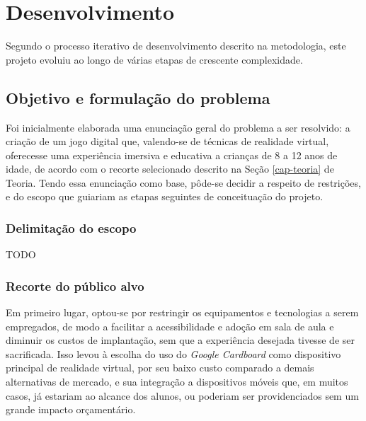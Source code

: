 
\chapter{Desenvolvimento}\label{cap-desenvolvimento}

Segundo o processo iterativo de desenvolvimento descrito na metodologia, este projeto evoluiu ao longo de várias etapas de crescente complexidade.


\section{Objetivo e formulação do problema}\label{sec-objetivos-formulacao-problema}

Foi inicialmente elaborada uma enunciação geral do problema a ser resolvido: a criação de um jogo digital que, valendo-se de técnicas de realidade virtual, oferecesse uma experiência imersiva e educativa a crianças de 8 a 12 anos de idade, de acordo com o recorte selecionado descrito na Seção \ref{cap-teoria} de Teoria. Tendo essa enunciação como base, pôde-se decidir a respeito de restrições, e do escopo que guiariam as etapas seguintes de conceituação do projeto.

\subsection{Delimitação do escopo}\label{subsec-delimitacao-escopo}
TODO

\subsection{Recorte do público alvo}\label{subsec-recorte-publico-alvo}

Em primeiro lugar, optou-se por restringir os equipamentos e tecnologias a serem empregados, de modo a facilitar a acessibilidade e adoção em sala de aula e diminuir os custos de implantação, sem que a experiência desejada tivesse de ser sacrificada. Isso levou à escolha do uso do \textit{Google Cardboard} como dispositivo principal de realidade virtual, por seu baixo custo comparado a demais alternativas de mercado, e sua integração a dispositivos móveis que, em muitos casos, já estariam ao alcance dos alunos, ou poderiam ser providenciados sem um grande impacto orçamentário.

